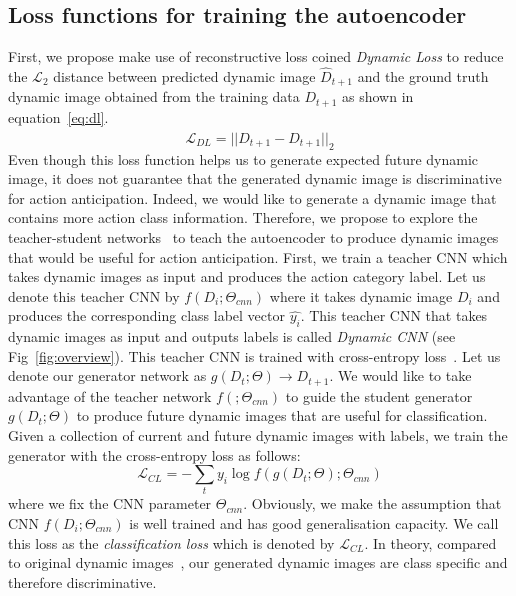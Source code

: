 \subsection{Loss functions for training the autoencoder}
\label{sec.digen}

First, we propose make use of reconstructive loss coined \emph{Dynamic Loss} to reduce the $\mathcal{L}_2$ distance between predicted dynamic image $\hat{D}_{t+1}$ and the ground truth dynamic image obtained from the training data $D_{t+1}$ as shown in equation~\ref{eq:dl}.
%
\begin{equation}
 \mathcal{L}_{DL} = ||\hat{D}_{t+1} - D_{t+1}||_2
 \label{eq:dl}
\end{equation}
%
Even though this loss function helps us to generate expected future dynamic image, it does not guarantee that the generated dynamic image is discriminative for action anticipation. 
Indeed, we would like to generate a dynamic image that contains more action class information.
Therefore, we propose to explore the teacher-student networks~\cite{hinton2015distilling} to teach the autoencoder to produce dynamic images that would be useful for action anticipation.
First, we train a teacher CNN which takes dynamic images as input and produces the action category label. Let us denote this teacher CNN by $f(D_i;\Theta_{cnn})$ where it takes dynamic image $D_i$ and produces the corresponding class label vector $\hat{y_i}$. 
This teacher CNN that takes dynamic images as input and outputs labels is called \emph{Dynamic CNN} (see Fig~\ref{fig:overview}).
This teacher CNN is trained with cross-entropy loss~\cite{szegedy2017inception}.
Let us denote our generator network as $g(D_t;\Theta)\rightarrow D_{t+1}$. We would like to take advantage of the teacher network $f(;\Theta_{cnn})$ to guide the student generator $g(D_t;\Theta)$ to produce future dynamic images that are useful for classification. Given a collection of current and future dynamic images with labels, we train the generator with the cross-entropy loss as follows:
%
\begin{equation}
 \mathcal{L}_{CL} = - \sum_t y_i \log f(g(D_t;\Theta);\Theta_{cnn})
\end{equation}
where we fix the CNN parameter $\Theta_{cnn}$. Obviously, we make the assumption that CNN $f(D_i;\Theta_{cnn})$ is well trained and has good generalisation capacity. 
We call this loss as the \emph{classification loss} which is denoted by $\mathcal{L}_{CL}$. 
In theory, compared to original dynamic images~\cite{bilen2016dynamic,Bilen2017}, our generated dynamic images are class specific and therefore discriminative.

